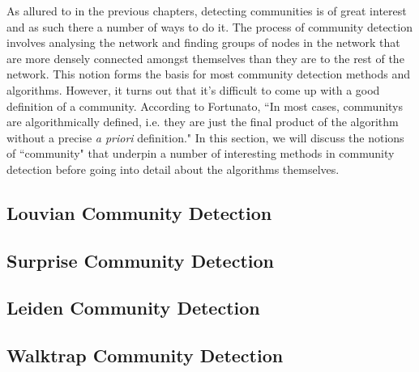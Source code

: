 As allured to in the previous chapters, detecting communities is of great interest and as such there a number of ways to do it. The process of community detection involves analysing the network and finding groups of nodes in the network that are more densely connected amongst themselves than they are to the rest of the network. This notion forms the basis for most community detection methods and algorithms. However, it turns out that it's difficult to come up with a good definition of a community. According to Fortunato, ``In most cases, communitys are algorithmically defined, i.e. they are just the final product of the algorithm without a precise \emph{a priori} definition."\cite[84]{fortunato} In this section, we will discuss the notions of ``community" that underpin a number of interesting methods in community detection before going into detail about the algorithms themselves.


%


\subsection{Louvian Community Detection}

\subsection{Surprise Community Detection}

\subsection{Leiden Community Detection}

\subsection{Walktrap Community Detection}
